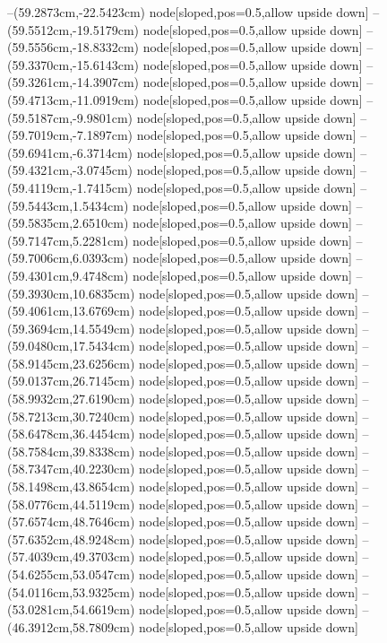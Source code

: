 --(59.2873cm,-22.5423cm) node[sloped,pos=0.5,allow upside down]{\ArrowIn}
--(59.5512cm,-19.5179cm) node[sloped,pos=0.5,allow upside down]{\ArrowIn}
--(59.5556cm,-18.8332cm) node[sloped,pos=0.5,allow upside down]{\arrowIn}
--(59.3370cm,-15.6143cm) node[sloped,pos=0.5,allow upside down]{\ArrowIn}
--(59.3261cm,-14.3907cm) node[sloped,pos=0.5,allow upside down]{\ArrowIn}
--(59.4713cm,-11.0919cm) node[sloped,pos=0.5,allow upside down]{\ArrowIn}
--(59.5187cm,-9.9801cm) node[sloped,pos=0.5,allow upside down]{\ArrowIn}
--(59.7019cm,-7.1897cm) node[sloped,pos=0.5,allow upside down]{\ArrowIn}
--(59.6941cm,-6.3714cm) node[sloped,pos=0.5,allow upside down]{\arrowIn}
--(59.4321cm,-3.0745cm) node[sloped,pos=0.5,allow upside down]{\ArrowIn}
--(59.4119cm,-1.7415cm) node[sloped,pos=0.5,allow upside down]{\ArrowIn}
--(59.5443cm,1.5434cm) node[sloped,pos=0.5,allow upside down]{\ArrowIn}
--(59.5835cm,2.6510cm) node[sloped,pos=0.5,allow upside down]{\ArrowIn}
--(59.7147cm,5.2281cm) node[sloped,pos=0.5,allow upside down]{\ArrowIn}
--(59.7006cm,6.0393cm) node[sloped,pos=0.5,allow upside down]{\arrowIn}
--(59.4301cm,9.4748cm) node[sloped,pos=0.5,allow upside down]{\ArrowIn}
--(59.3930cm,10.6835cm) node[sloped,pos=0.5,allow upside down]{\ArrowIn}
--(59.4061cm,13.6769cm) node[sloped,pos=0.5,allow upside down]{\ArrowIn}
--(59.3694cm,14.5549cm) node[sloped,pos=0.5,allow upside down]{\arrowIn}
--(59.0480cm,17.5434cm) node[sloped,pos=0.5,allow upside down]{\ArrowIn}
--(58.9145cm,23.6256cm) node[sloped,pos=0.5,allow upside down]{\ArrowIn}
--(59.0137cm,26.7145cm) node[sloped,pos=0.5,allow upside down]{\ArrowIn}
--(58.9932cm,27.6190cm) node[sloped,pos=0.5,allow upside down]{\arrowIn}
--(58.7213cm,30.7240cm) node[sloped,pos=0.5,allow upside down]{\ArrowIn}
--(58.6478cm,36.4454cm) node[sloped,pos=0.5,allow upside down]{\ArrowIn}
--(58.7584cm,39.8338cm) node[sloped,pos=0.5,allow upside down]{\ArrowIn}
--(58.7347cm,40.2230cm) node[sloped,pos=0.5,allow upside down]{\arrowIn}
--(58.1498cm,43.8654cm) node[sloped,pos=0.5,allow upside down]{\ArrowIn}
--(58.0776cm,44.5119cm) node[sloped,pos=0.5,allow upside down]{\arrowIn}
--(57.6574cm,48.7646cm) node[sloped,pos=0.5,allow upside down]{\ArrowIn}
--(57.6352cm,48.9248cm) node[sloped,pos=0.5,allow upside down]{\arrowIn}
--(57.4039cm,49.3703cm) node[sloped,pos=0.5,allow upside down]{\arrowIn}
--(54.6255cm,53.0547cm) node[sloped,pos=0.5,allow upside down]{\ArrowIn}
--(54.0116cm,53.9325cm) node[sloped,pos=0.5,allow upside down]{\ArrowIn}
--(53.0281cm,54.6619cm) node[sloped,pos=0.5,allow upside down]{\ArrowIn}
--(46.3912cm,58.7809cm) node[sloped,pos=0.5,allow upside down]{\ArrowIn}
